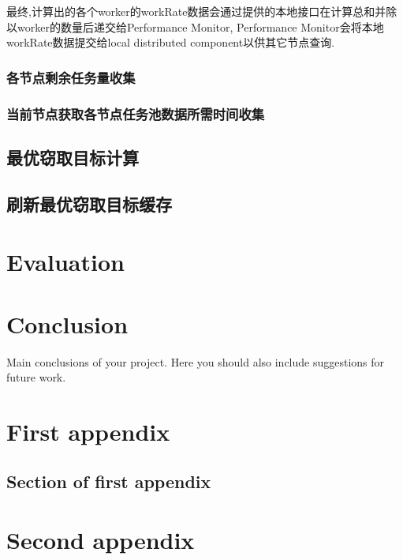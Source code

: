 \documentclass{mproj}
\begin{document}
最终,计算出的各个worker的workRate数据会通过提供的本地接口在计算总和并除以worker的数量后递交给Performance Monitor,
Performance Monitor会将本地workRate数据提交给local distributed component以供其它节点查询.


\subsection{各节点剩余任务量收集}


\subsection{当前节点获取各节点任务池数据所需时间收集}


\section{最优窃取目标计算}

\section{刷新最优窃取目标缓存}


\chapter{Evaluation}


\chapter{Conclusion}\label{conclusion}

Main conclusions of your project. Here you should also include suggestions for future work.

\appendix %
\chapter{First appendix}

\section{Section of first appendix}

\chapter{Second appendix}



\end{document}

